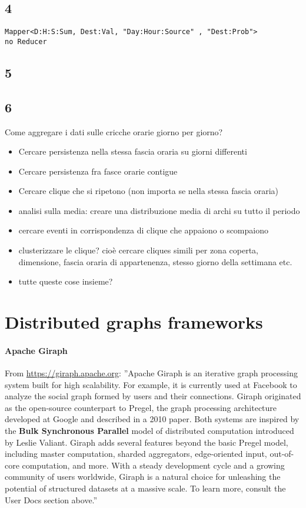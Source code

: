 \documentclass[10pt,a4paper]{article}
\begin{document}
\subsection{4}
\begin{verbatim}
Mapper<D:H:S:Sum, Dest:Val, "Day:Hour:Source" , "Dest:Prob">
no Reducer
\end{verbatim}

\subsection{5}

\subsection{6}

Come aggregare i dati sulle cricche orarie giorno per giorno?
\begin{itemize}
\item Cercare persistenza nella stessa fascia oraria su giorni differenti
\item Cercare persistenza fra fasce orarie contigue
\item Cercare clique che si ripetono (non importa se nella stessa fascia oraria)
\item analisi sulla media: creare una distribuzione media di archi su tutto il periodo
\item cercare eventi in corrispondenza di clique che appaiono o scompaiono
\item clusterizzare le clique? cioè cercare cliques simili per zona coperta, dimensione, fascia oraria
di appartenenza, stesso giorno della settimana etc.
\item tutte queste cose insieme?
\end{itemize}

\section{Distributed graphs frameworks}
\paragraph{Apache Giraph} From \url{https://giraph.apache.org}: ''Apache Giraph is an iterative graph processing system built for high scalability. For example, it is currently used at Facebook to analyze the social graph formed by users and their connections. Giraph originated as the open-source counterpart to Pregel, the graph processing architecture developed at Google and described in a 2010 paper. Both systems are inspired by the \textbf{Bulk Synchronous Parallel} model of distributed computation introduced by Leslie Valiant. Giraph adds several features beyond the basic Pregel model, including master computation, sharded aggregators, edge-oriented input, out-of-core computation, and more. With a steady development cycle and a growing community of users worldwide, Giraph is a natural choice for unleashing the potential of structured datasets at a massive scale. To learn more, consult the User Docs section above.''
\end{document}
